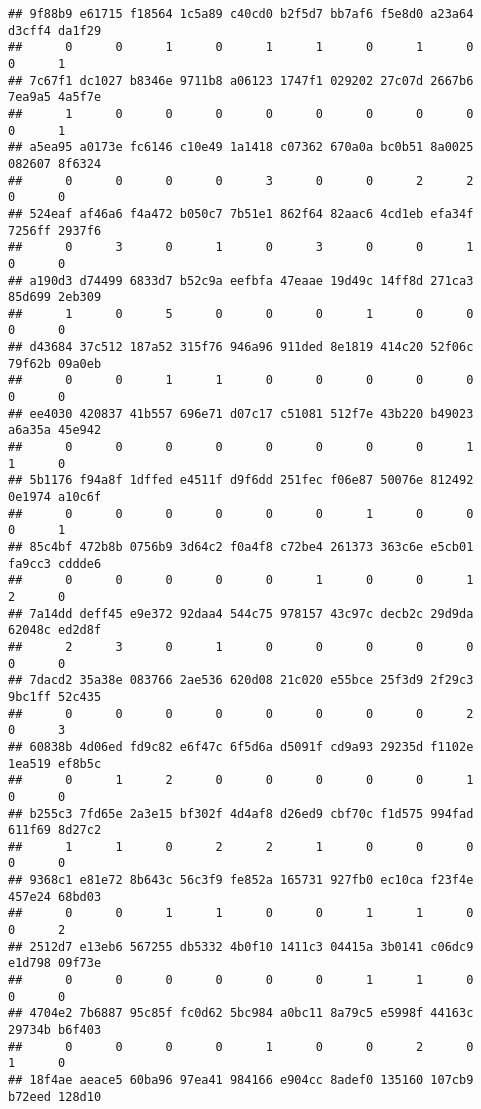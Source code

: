 \documentclass[
]{article}
\begin{document}
\begin{verbatim}
## 9f88b9 e61715 f18564 1c5a89 c40cd0 b2f5d7 bb7af6 f5e8d0 a23a64 d3cff4 da1f29 
##      0      0      1      0      1      1      0      1      0      0      1 
## 7c67f1 dc1027 b8346e 9711b8 a06123 1747f1 029202 27c07d 2667b6 7ea9a5 4a5f7e 
##      1      0      0      0      0      0      0      0      0      0      1 
## a5ea95 a0173e fc6146 c10e49 1a1418 c07362 670a0a bc0b51 8a0025 082607 8f6324 
##      0      0      0      0      3      0      0      2      2      0      0 
## 524eaf af46a6 f4a472 b050c7 7b51e1 862f64 82aac6 4cd1eb efa34f 7256ff 2937f6 
##      0      3      0      1      0      3      0      0      1      0      0 
## a190d3 d74499 6833d7 b52c9a eefbfa 47eaae 19d49c 14ff8d 271ca3 85d699 2eb309 
##      1      0      5      0      0      0      1      0      0      0      0 
## d43684 37c512 187a52 315f76 946a96 911ded 8e1819 414c20 52f06c 79f62b 09a0eb 
##      0      0      1      1      0      0      0      0      0      0      0 
## ee4030 420837 41b557 696e71 d07c17 c51081 512f7e 43b220 b49023 a6a35a 45e942 
##      0      0      0      0      0      0      0      0      1      1      0 
## 5b1176 f94a8f 1dffed e4511f d9f6dd 251fec f06e87 50076e 812492 0e1974 a10c6f 
##      0      0      0      0      0      0      1      0      0      0      1 
## 85c4bf 472b8b 0756b9 3d64c2 f0a4f8 c72be4 261373 363c6e e5cb01 fa9cc3 cddde6 
##      0      0      0      0      0      1      0      0      1      2      0 
## 7a14dd deff45 e9e372 92daa4 544c75 978157 43c97c decb2c 29d9da 62048c ed2d8f 
##      2      3      0      1      0      0      0      0      0      0      0 
## 7dacd2 35a38e 083766 2ae536 620d08 21c020 e55bce 25f3d9 2f29c3 9bc1ff 52c435 
##      0      0      0      0      0      0      0      0      2      0      3 
## 60838b 4d06ed fd9c82 e6f47c 6f5d6a d5091f cd9a93 29235d f1102e 1ea519 ef8b5c 
##      0      1      2      0      0      0      0      0      1      0      0 
## b255c3 7fd65e 2a3e15 bf302f 4d4af8 d26ed9 cbf70c f1d575 994fad 611f69 8d27c2 
##      1      1      0      2      2      1      0      0      0      0      0 
## 9368c1 e81e72 8b643c 56c3f9 fe852a 165731 927fb0 ec10ca f23f4e 457e24 68bd03 
##      0      0      1      1      0      0      1      1      0      0      2 
## 2512d7 e13eb6 567255 db5332 4b0f10 1411c3 04415a 3b0141 c06dc9 e1d798 09f73e 
##      0      0      0      0      0      0      1      1      0      0      0 
## 4704e2 7b6887 95c85f fc0d62 5bc984 a0bc11 8a79c5 e5998f 44163c 29734b b6f403 
##      0      0      0      0      1      0      0      2      0      1      0 
## 18f4ae aeace5 60ba96 97ea41 984166 e904cc 8adef0 135160 107cb9 b72eed 128d10 

\end{verbatim}
\end{document}
